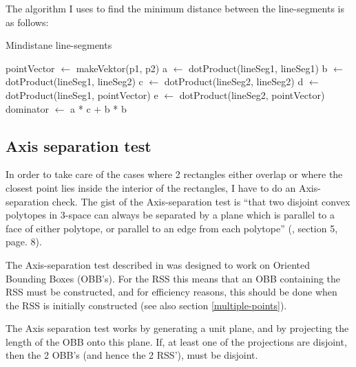 The algorithm I uses to find the minimum distance between the line-segments is as follows:\\
\begin{algorithm}[H]
  \caption{Mindistane line-segments}
  \label{mindist-lineseg}
   
  \dontprintsemicolon
   pointVector $\gets$ makeVektor(p1, p2) \;
   a $\gets$ dotProduct(lineSeg1, lineSeg1) \;
   b $\gets$ dotProduct(lineSeg1, lineSeg2) \;
   c $\gets$ dotProduct(lineSeg2, lineSeg2) \;
   d $\gets$ dotProduct(lineSeg1, pointVector) \;
   e $\gets$ dotProduct(lineSeg2, pointVector) \;
   dominator $\gets$ a * c + b * b \;
\end{algorithm}

\subsection{Axis separation test}
\label{sepAxis}

In order to take care of the cases where 2 rectangles either overlap or where the closest point lies inside the interior of the rectangles, I have to do an Axis-separation check. The gist of the Axis-separation test is ``that two disjoint convex polytopes in 3-space can always be separated by a plane which is parallel to a face of either polytope, or parallel to an edge from each polytope'' (\cite{237244}, section 5, page. 8).

The Axis-separation test described in \cite{237244} was designed to work on Oriented Bounding Boxes (OBB's). For the RSS this means that an OBB containing the RSS must be constructed, and for efficiency reasons, this should be done when the RSS is initially constructed (see also section \ref{multiple-points}). 

The Axis separation test works by generating a unit plane, and by projecting the length of the OBB onto this plane. If, at least one of the projections are disjoint, then the 2 OBB's (and hence the 2 RSS'), must be disjoint.


